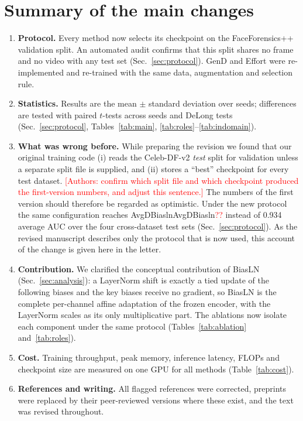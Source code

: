 \documentclass[11pt]{article}
\newif\ifpending\pendingtrue
\newcommand{\pending}[1]{\ifpending\textcolor{red}{[#1]}\else\errmessage{pending: #1}\fi}
\newcommand{\num}[1]{\ifcsname #1\endcsname\csname #1\endcsname\else\textcolor{red}{??}\fi}
\begin{document}
\section*{Summary of the main changes}
\begin{enumerate}
\item \textbf{Protocol.} Every method now selects its checkpoint on the FaceForensics++ validation split. An automated audit confirms that this split shares no frame and no video with any test set (Sec.~\ref{sec:protocol}). GenD and Effort were re-implemented and re-trained with the same data, augmentation and selection rule.
\item \textbf{Statistics.} Results are the mean $\pm$ standard deviation over seeds; differences are tested with paired $t$-tests across seeds and DeLong tests (Sec.~\ref{sec:protocol}, Tables~\ref{tab:main}, \ref{tab:roles}--\ref{tab:indomain}).
\item \textbf{What was wrong before.} While preparing the revision we found that our original training code (i) reads the Celeb-DF-v2 \emph{test} split for validation unless a separate split file is supplied, and (ii) stores a ``best'' checkpoint for every test dataset. \pending{Authors: confirm which split file and which checkpoint produced the first-version numbers, and adjust this sentence.} The numbers of the first version should therefore be regarded as optimistic. Under the new protocol the same configuration reaches \num{AvgDBiasln} instead of 0.934 average AUC over the four cross-dataset test sets (Sec.~\ref{sec:protocol}). As the revised manuscript describes only the protocol that is now used, this account of the change is given here in the letter.
\item \textbf{Contribution.} We clarified the conceptual contribution of BiasLN (Sec.~\ref{sec:analysis}): a LayerNorm shift is exactly a tied update of the following biases and the key biases receive no gradient, so BiasLN is the complete per-channel affine adaptation of the frozen encoder, with the LayerNorm scales as its only multiplicative part. The ablations now isolate each component under the same protocol (Tables~\ref{tab:ablation} and~\ref{tab:roles}).
\item \textbf{Cost.} Training throughput, peak memory, inference latency, FLOPs and checkpoint size are measured on one GPU for all methods (Table~\ref{tab:cost}).
\item \textbf{References and writing.} All flagged references were corrected, preprints were replaced by their peer-reviewed versions where these exist, and the text was revised throughout.
\end{enumerate}
\end{document}
